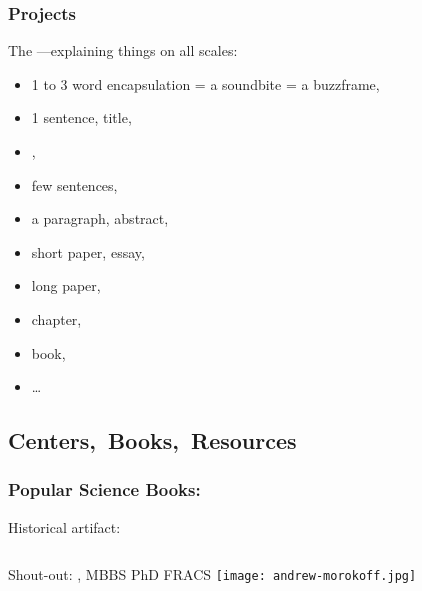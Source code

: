 \begin{frame}
  \frametitle{Projects}

  \begin{block}{The ---explaining things on all scales:}
    \begin{itemize}
    \item 
      1 to 3 word encapsulation = a soundbite = a buzzframe,
    \item 
      1 sentence, title,
    \item 
      ,
    \item 
      few sentences,
    \item 
      a paragraph, abstract,
    \item 
      short paper, essay,
    \item 
      long paper,
    \item 
      chapter,
    \item 
      book,
    \item 
      \ldots
    \end{itemize}
  \end{block}

\end{frame}


\subsection{Centers,\ Books,\ Resources}

\begin{frame}
  \frametitle{Popular Science Books:}

  Historical artifact:
  \bigskip
  \bigskip
  
  \begin{overprint}
    \begin{columns}
      Shout-out:
      , \newline
      MBBS PhD FRACS 
      \texttt{[image: andrew-morokoff.jpg]}
    \end{columns}
  \end{overprint}

\end{frame}

